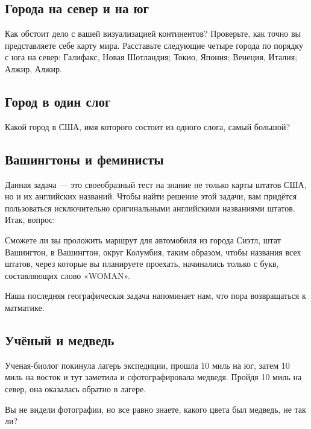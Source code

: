\subsection*{Города на север и на юг}%


Как обстоит дело с вашей визуализацией континентов?
Проверьте, как точно вы представляете себе %
карту мира.
Расставьте следующие  четыре города по порядку с юга на север: 
Галифакс, Новая Шотландия; %
Токио, Япония; %
Венеция, Италия; %
Алжир, Алжир. %


\subsection*{Город в один слог}%


Какой город в США, имя которого состоит из одного слога,  самый большой?


\subsection*{Вашингтоны и феминисты}%


Данная задача --- это своеобразный тест на знание не только карты штатов США, но и их английских названий.  
Чтобы найти решение этой задачи, вам придётся пользоваться исключительно оригинальными английскими названиями штатов.  
Итак, вопрос:


Сможете ли вы проложить маршрут для автомобиля из города Сиэтл, штат Вашингтон, 
 в Вашингтон, округ Колумбия, таким образом, чтобы названия всех штатов, через которые вы планируете проехать, начинались только с букв, составляющих слово  «WOMAN».

Наша последняя географическая задача  напоминает нам, что пора возвращаться к матматике.  %


\subsection*{Учёный и медведь}%


Ученая-биолог покинула лагерь экспедиции, прошла 10 миль на юг, затем 10 миль на восток и тут заметила и сфотографировала медведя.  Пройдя 10 миль на север, она оказалась обратно в лагере. 

Вы не видели фотографии, но все равно знаете, какого цвета был медведь, не так ли?